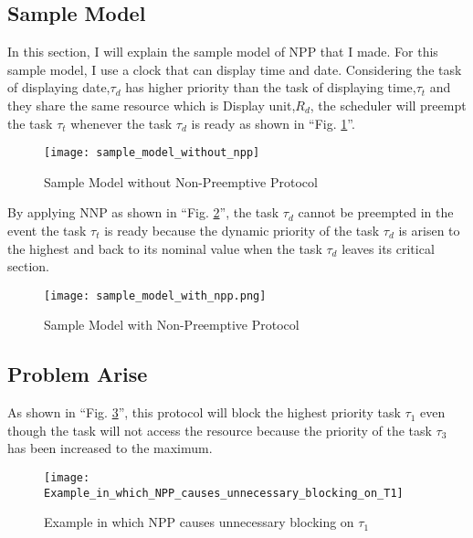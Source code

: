 \subsection{Sample Model}

In this section, I will explain the sample model of NPP that I made. For this sample model, I use a clock that can display time and date. Considering the task of displaying date,$\tau_{d}$ has higher priority than the task of displaying time,$\tau_{t}$ and they share the same resource which is Display unit,$R_{d}$, the scheduler will preempt the task $\tau_{t}$ whenever the task $\tau_{d}$ is ready as shown in ``Fig. \ref{fig:sample_model_without_npp}''.
\begin{figure}[ht]
    \centering
    \texttt{[image: sample\_model\_without\_npp]}
    \caption{Sample Model without Non-Preemptive Protocol} \cite{b6}
    \label{fig:sample_model_without_npp}
\end{figure}

By applying NNP as shown in ``Fig. \ref{fig:sample_model_with_npp}'', the task $\tau_{d}$ cannot be preempted in the event the task $\tau_{t}$ is ready because the dynamic priority of the task $\tau_{d}$ is arisen to the highest and back to its nominal value when the task $\tau_{d}$ leaves its critical section. 


\begin{figure}[ht]
    \centering
    \texttt{[image: sample\_model\_with\_npp.png]}
    \caption{Sample Model with Non-Preemptive Protocol }
    \label{fig:sample_model_with_npp}
\end{figure}


\subsection{Problem Arise}

As shown in ``Fig. \ref{fig:Example_in_which_NPP_causes_unnecessary_blocking_on_T1}'', this protocol will block the highest priority task $ \tau_{1} $ even though the task will not access the resource because the priority of the task $\tau_{3}$ has been increased to the maximum.

\begin{figure}[ht]
    \centering
    \texttt{[image: Example\_in\_which\_NPP\_causes\_unnecessary\_blocking\_on\_T1]}
    \caption{Example in which NPP causes unnecessary blocking on $ \tau_{1} $ \cite{b5}}
    \label{fig:Example_in_which_NPP_causes_unnecessary_blocking_on_T1}
\end{figure}


